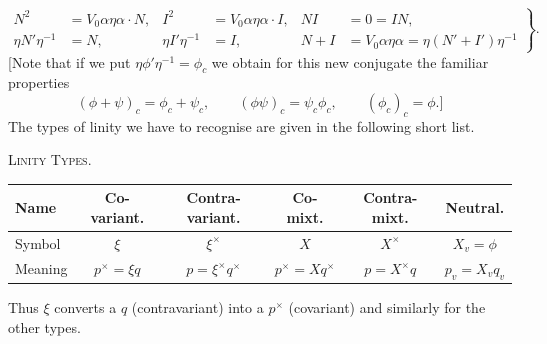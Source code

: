 \documentclass[11pt]{article}
\begin{document}
\begin{equation}\left.\begin{aligned}
N^2&=V_0\alpha\eta\alpha\cdot N,&I^2&=V_0\alpha\eta\alpha\cdot I,&NI&=0=IN,\\
\eta N'\eta^{-1}&=N,&\eta I'\eta^{-1}&=I,&N+I&=V_0\alpha\eta\alpha=\eta(N'+I')\eta^{-1}
\end{aligned}\right\}.\tag{7}\end{equation}
[Note that if we put $\eta\phi'\eta^{-1}=\phi_c$ we obtain for this new conjugate the familiar properties
\[
(\phi+\psi)_c=\phi_c+\psi_c,\qquad(\phi\psi)_c=\psi_c\phi_c,\qquad(\phi_c)_c=\phi.]
\]
The types of linity we have to recognise are given in the following short list.
\begin{center}\textsc{Linity Types.}\end{center}
\begin{center}\begin{tabular}{|l|c|c|c|c|c|}\hline
Name & Co-variant. & Contra-variant. & Co-mixt. & Contra-mixt. & Neutral.\\\hline
Symbol & $\xi$ & $\xi^\times$ & $X$ & $X^\times$ & $X_v=\phi$\\
Meaning & $p^\times=\xi q$ & $p=\xi^\times q^\times$ & $p^\times=Xq^\times$ & $p=X^\times q$ & $p_v=X_vq_v$\\\hline
\end{tabular}\end{center}
Thus $\xi$ converts a $q$ (contravariant) into a $p^\times$ (covariant) and similarly for the other types.
\end{document}
